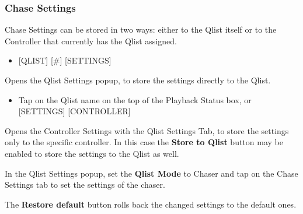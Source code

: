 \documentclass[
]{article}
\providecommand{\tightlist}{%
  \setlength{\itemsep}{0pt}\setlength{\parskip}{0pt}}
\begin{document}
\hypertarget{chase-settings}{%
\subsubsection{Chase Settings}\label{chase-settings}}

Chase Settings can be stored in two ways: either to the Qlist itself or to the Controller that currently has the Qlist assigned.

\begin{itemize}
\tightlist
\item
  {[}QLIST{]} {[}\#{]} {[}SETTINGS{]}
\end{itemize}

Opens the Qlist Settings popup, to store the settings directly to the Qlist.

\begin{itemize}
\tightlist
\item
  Tap on the Qlist name on the top of the Playback Status box, or {[}SETTINGS{]} {[}CONTROLLER{]}
\end{itemize}

Opens the Controller Settings with the Qlist Settings Tab, to store the settings only to the specific controller. In this case the \textbf{Store to Qlist} button may be enabled to store the settings to the Qlist as well.

In the Qlist Settings popup, set the \textbf{Qlist Mode} to Chaser and tap on the Chase Settings tab to set the settings of the chaser.

The \textbf{Restore default} button rolls back the changed settings to the default ones.
\end{document}
